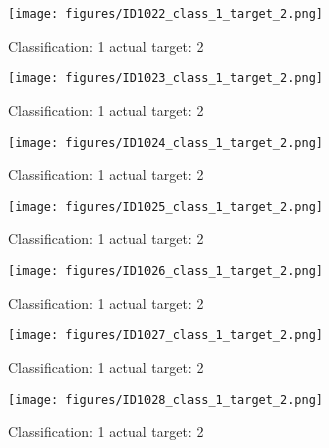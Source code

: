 \begin{figure}[h!]
\begin{center}
\texttt{[image: figures/ID1022\_class\_1\_target\_2.png]}
\end{center}
\caption{ Classification: 1 actual target: 2}
\label{fig:ID1022_class_1_target_2}
\end{figure}
\begin{figure}[h!]
\begin{center}
\texttt{[image: figures/ID1023\_class\_1\_target\_2.png]}
\end{center}
\caption{ Classification: 1 actual target: 2}
\label{fig:ID1023_class_1_target_2}
\end{figure}
\begin{figure}[h!]
\begin{center}
\texttt{[image: figures/ID1024\_class\_1\_target\_2.png]}
\end{center}
\caption{ Classification: 1 actual target: 2}
\label{fig:ID1024_class_1_target_2}
\end{figure}
\begin{figure}[h!]
\begin{center}
\texttt{[image: figures/ID1025\_class\_1\_target\_2.png]}
\end{center}
\caption{ Classification: 1 actual target: 2}
\label{fig:ID1025_class_1_target_2}
\end{figure}
\begin{figure}[h!]
\begin{center}
\texttt{[image: figures/ID1026\_class\_1\_target\_2.png]}
\end{center}
\caption{ Classification: 1 actual target: 2}
\label{fig:ID1026_class_1_target_2}
\end{figure}
\begin{figure}[h!]
\begin{center}
\texttt{[image: figures/ID1027\_class\_1\_target\_2.png]}
\end{center}
\caption{ Classification: 1 actual target: 2}
\label{fig:ID1027_class_1_target_2}
\end{figure}
\begin{figure}[h!]
\begin{center}
\texttt{[image: figures/ID1028\_class\_1\_target\_2.png]}
\end{center}
\caption{ Classification: 1 actual target: 2}
\label{fig:ID1028_class_1_target_2}
\end{figure}
